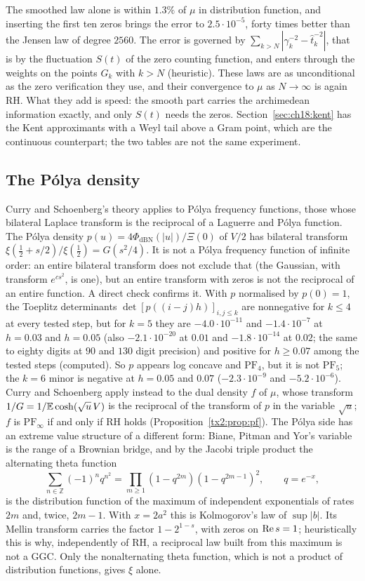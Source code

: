 The smoothed law alone is within $1.3\%$ of $\mu$ in distribution function, and inserting the first ten zeros brings the error to $2.5\cdot10^{-5}$, forty times better than the Jensen law of degree $2560$. The error is governed by $\sum_{k>N}|\gamma_k^{-2}-\hat t_k^{-2}|$, that is by the fluctuation $S(t)$ of the zero counting function, and enters through the weights on the points $G_k$ with $k>N$ (heuristic). These laws are as unconditional as the zero verification they use, and their convergence to $\mu$ as $N\to\infty$ is again RH. What they add is speed: the smooth part carries the archimedean information exactly, and only $S(t)$ needs the zeros. Section~\ref{sec:ch18:kent} has the Kent approximants with a Weyl tail above a Gram point, which are the continuous counterpart; the two tables are not the same experiment.

\subsection{The P\'olya density}
Curry and Schoenberg's theory applies to P\'olya frequency functions, those whose bilateral Laplace transform is the reciprocal of a Laguerre and P\'olya function. The P\'olya density $p(u)=4\Phi_{\mathrm{dBN}}(|u|)/\Xi(0)$ of $V/2$ has bilateral transform $\xi(\frac12+s/2)/\xi(\frac12)=G(s^2/4)$. It is not a P\'olya frequency function of infinite order: an entire bilateral transform does not exclude that (the Gaussian, with transform $e^{cs^2}$, is one), but an entire transform with zeros is not the reciprocal of an entire function. A direct check confirms it. With $p$ normalised by $p(0)=1$, the Toeplitz determinants $\det[p((i-j)h)]_{i,j\le k}$ are nonnegative for $k\le4$ at every tested step, but for $k=5$ they are $-4.0\cdot10^{-11}$ and $-1.4\cdot10^{-7}$ at $h=0.03$ and $h=0.05$ (also $-2.1\cdot10^{-20}$ at $0.01$ and $-1.8\cdot10^{-14}$ at $0.02$; the same to eighty digits at $90$ and $130$ digit precision) and positive for $h\ge0.07$ among the tested steps (computed). So $p$ appears log concave and $\mathrm{PF}_4$, but it is not $\mathrm{PF}_5$; the $k=6$ minor is negative at $h=0.05$ and $0.07$ ($-2.3\cdot10^{-9}$ and $-5.2\cdot10^{-6}$). Curry and Schoenberg apply instead to the dual density $f$ of $\mu$, whose transform $1/G=1/\mathbb{E}\cosh(\sqrt u\,V)$ is the reciprocal of the transform of $p$ in the variable $\sqrt u$; $f$ is $\mathrm{PF}_\infty$ if and only if RH holds (Proposition~\ref{tx2:prop:pf}). The P\'olya side has an extreme value structure of a different form: Biane, Pitman and Yor's variable \cite{BPY01} is the range of a Brownian bridge, and by the Jacobi triple product the alternating theta function
\[
\sum_{n\in\mathbb Z}(-1)^nq^{n^2}=\prod_{m\ge1}(1-q^{2m})(1-q^{2m-1})^2,\qquad q=e^{-x},
\]
is the distribution function of the maximum of independent exponentials of rates $2m$ and, twice, $2m-1$. With $x=2a^2$ this is Kolmogorov's law of $\sup|b|$. Its Mellin transform carries the factor $1-2^{1-s}$, with zeros on $\operatorname{Re} s=1$; heuristically this is why, independently of RH, a reciprocal law built from this maximum is not a GGC. Only the nonalternating theta function, which is not a product of distribution functions, gives $\xi$ alone.

